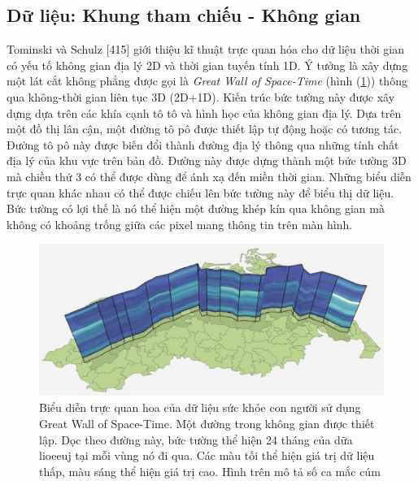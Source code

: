 \subsection{Dữ liệu: Khung tham chiếu - Không gian}
Tominski và Schulz [415] giới thiệu kĩ thuật trực quan hóa cho dữ liệu thời gian có yếu tố không gian địa lý 2D và thời gian tuyến tính 1D. Ý tưởng là xây dựng một lát cắt không phẳng được gọi là \textit{Great Wall of Space-Time} (hình (\ref{fig:f7.4})) thông qua không-thời gian liên tục 3D (2D+1D). Kiến trúc bức tường này được xây dựng dựa trên các khía cạnh tô tô và hình học của không gian địa lý. Dựa trên một đồ thị lân cận, một đường tô pô được thiết lập tự động hoặc có tương tác. Đường tô pô này được biến đổi thành đường địa lý thông qua những tính chất địa lý của khu vực trên bản đồ. Đường này được dựng thành một bức tường 3D mà chiều thứ 3 có thể được dùng để ánh xạ đến miền thời gian. Những biểu diễn trực quan khác nhau có thể được chiếu lên bức tường này để biểu thị dữ liệu. Bức tường có lợi thế là nó thể hiện một đường khép kín qua không gian mà không có khoảng trống giữa các pixel mang thông tin trên màn hình. 
\begin{figure}[H] %
    \centering %
    \includegraphics[width=1\textwidth]{assets/fig_7_4.png} 
    \caption{Biểu diễn trực quan hoa của dữ liệu sức khỏe con người sử dụng Great Wall of Space-Time. Một đường trong không gian được thiết lập. Dọc theo đường này, bức tường thể hiện 24 tháng của dữa lioeeuj tại mỗi vùng nó đi qua. Các màu tối thể hiện giá trị dữ liệu thấp, màu sáng thể hiện giá trị cao. Hình trên mô tả số ca mắc cúm } %
    \label{fig:f7.4}
\end{figure}